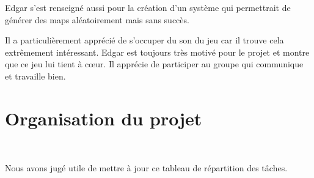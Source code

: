 \documentclass[titlepage, 13px, a4paper]{report}
\begin{document}
Edgar s’est renseigné aussi pour la création d’un système qui permettrait de générer des maps aléatoirement mais sans succès. 

Il a particulièrement apprécié de s'occuper du son du jeu car il trouve cela extrêmement intéressant.
Edgar est toujours très motivé pour le projet et montre que ce jeu lui tient à cœur.
Il apprécie de participer au groupe qui communique et travaille bien.



\newpage
{}
\part{Organisation du projet}
\paragraph{} \hspace{0pt} \\ 
Nous avons jugé utile de mettre à jour ce tableau de répartition des tâches.
\\ \\
\end{document}
